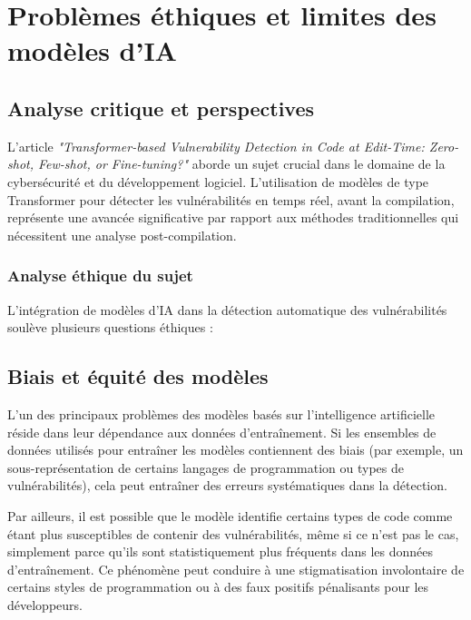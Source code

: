 \chapter{Problèmes éthiques et limites des modèles d’IA}



\section{Analyse critique et perspectives}



L'article \textit{"Transformer-based
Vulnerability Detection in Code at Edit-Time: Zero-shot, Few-shot, or
Fine-tuning?"} aborde un sujet crucial dans le domaine de la
cybersécurité et du développement logiciel. L'utilisation de modèles de type
Transformer pour détecter les vulnérabilités en temps réel, avant la
compilation, représente une avancée significative par rapport aux méthodes
traditionnelles qui nécessitent une analyse post-compilation.



\subsection{Analyse éthique du sujet}



L’intégration
de modèles d’IA dans la détection automatique des vulnérabilités soulève
plusieurs questions éthiques :



\section{Biais et équité des modèles}



L'un des
principaux problèmes des modèles basés sur l’intelligence artificielle réside
dans leur dépendance aux données d’entraînement. Si les ensembles de données
utilisés pour entraîner les modèles contiennent des biais (par exemple, un
sous-représentation de certains langages de programmation ou types de
vulnérabilités), cela peut entraîner des erreurs systématiques dans la
détection.



Par
ailleurs, il est possible que le modèle identifie certains types de code comme
étant plus susceptibles de contenir des vulnérabilités, même si ce n’est pas le
cas, simplement parce qu’ils sont statistiquement plus fréquents dans les
données d'entraînement. Ce phénomène peut conduire à une stigmatisation
involontaire de certains styles de programmation ou à des faux positifs
pénalisants pour les développeurs.



